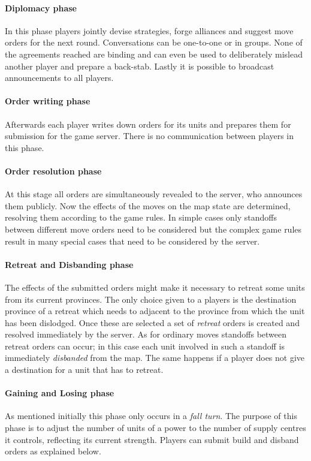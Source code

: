 \documentclass[pdftex,12pt,a4paper]{report}
\begin{document}
\paragraph{Diplomacy phase}
In this phase players jointly devise strategies, forge alliances and
suggest move orders for the next round. Conversations can be 
one-to-one or in groups. None of the agreements
reached are binding and can even be used to deliberately 
mislead another player and prepare a back-stab. Lastly it is possible
to broadcast announcements to all players.

\paragraph{Order writing phase}
Afterwards each player writes down orders for its units and prepares
them for submission for the game server. There is no communication 
between players in this phase. 

\paragraph{Order resolution phase}
At this stage all orders are simultaneously revealed to the server,
who announces them publicly. Now the effects of the moves on the
map state are determined, resolving them according to the game rules.
In simple cases only standoffs between different move orders need
to be considered but the complex game rules result in many special
cases that need to be considered by the server. 

\paragraph{Retreat and Disbanding phase}
The effects of the submitted orders might make it necessary to retreat
some units from its current provinces. The only choice given to a
players is the destination province of a retreat which needs to
adjacent to the province from which the unit has been dislodged. Once
these are selected a set of \textit{retreat} orders is created and
resolved immediately by the server. As for ordinary moves standoffs
between retreat orders can occur; in this case each unit involved in
such a standoff is immediately \textit{disbanded} from the map. The
same happens if a player does not give a destination for a unit that
has to retreat.

\paragraph{Gaining and Losing phase}
As mentioned initially this phase only occurs in a \textit{fall turn}.
The purpose of this phase is to adjust the number of units of a power
to the number of supply centres it controls, reflecting its current
strength. Players can submit build and disband orders as explained
below. 
\end{document}
